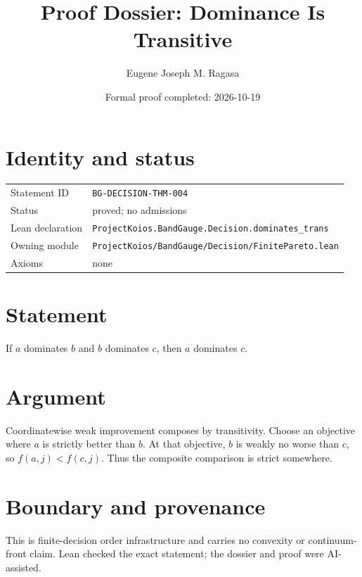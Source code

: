 \documentclass[11pt]{article}
\title{Proof Dossier: Dominance Is Transitive}
\author{Eugene Joseph M. Ragasa}
\date{Formal proof completed: 2026-10-19}
\begin{document}
\maketitle
\section{Identity and status}
\begin{tabularx}{\textwidth}{@{}lX@{}}\toprule
Statement ID & \texttt{BG-DECISION-THM-004} \\
Status & proved; no admissions \\
Lean declaration & \texttt{ProjectKoios.BandGauge.Decision.dominates\_trans} \\
Owning module & \texttt{ProjectKoios/BandGauge/Decision/FinitePareto.lean} \\
Axioms & none \\
\bottomrule\end{tabularx}
\section{Statement}
If $a$ dominates $b$ and $b$ dominates $c$, then $a$ dominates $c$.
\section{Argument}
Coordinatewise weak improvement composes by transitivity. Choose an objective where
$a$ is strictly better than $b$. At that objective, $b$ is weakly no worse than $c$,
so $f(a,j)<f(c,j)$. Thus the composite comparison is strict somewhere.
\section{Boundary and provenance}
This is finite-decision order infrastructure and carries no convexity or continuum-front
claim. Lean checked the exact statement; the dossier and proof were AI-assisted.
\end{document}
